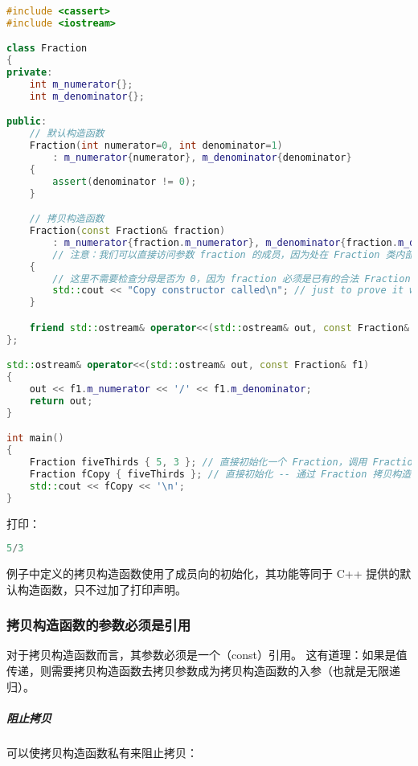 \documentclass[../../LearnCpp.tex]{subfiles}
\begin{document}
\begin{lstlisting}[language=C++]
#include <cassert>
#include <iostream>

class Fraction
{
private:
    int m_numerator{};
    int m_denominator{};

public:
    // 默认构造函数
    Fraction(int numerator=0, int denominator=1)
        : m_numerator{numerator}, m_denominator{denominator}
    {
        assert(denominator != 0);
    }

    // 拷贝构造函数
    Fraction(const Fraction& fraction)
        : m_numerator{fraction.m_numerator}, m_denominator{fraction.m_denominator}
        // 注意：我们可以直接访问参数 fraction 的成员，因为处在 Fraction 类内部
    {
        // 这里不需要检查分母是否为 0，因为 fraction 必须是已有的合法 Fraction
        std::cout << "Copy constructor called\n"; // just to prove it works
    }

    friend std::ostream& operator<<(std::ostream& out, const Fraction& f1);
};

std::ostream& operator<<(std::ostream& out, const Fraction& f1)
{
	out << f1.m_numerator << '/' << f1.m_denominator;
	return out;
}

int main()
{
	Fraction fiveThirds { 5, 3 }; // 直接初始化一个 Fraction，调用 Fraction(int, int) 构造函数
	Fraction fCopy { fiveThirds }; // 直接初始化 -- 通过 Fraction 拷贝构造函数
	std::cout << fCopy << '\n';
}
\end{lstlisting}

打印：

\begin{lstlisting}[language=C++]
5/3
\end{lstlisting}

例子中定义的拷贝构造函数使用了成员向的初始化，其功能等同于 C++ 提供的默认构造函数，只不过加了打印声明。

\subsubsection*{拷贝构造函数的参数必须是引用}

对于拷贝构造函数而言，其参数必须是一个（const）引用。
这有道理：如果是值传递，则需要拷贝构造函数去拷贝参数成为拷贝构造函数的入参（也就是无限递归）。

\subparagraph*{阻止拷贝}

可以使拷贝构造函数私有来阻止拷贝：
\end{document}
